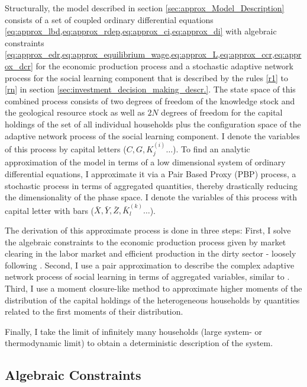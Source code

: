 Structurally, the model described in section \ref{sec:approx_Model_Description} consists of a set of coupled ordinary differential equations \cref{eq:approx_lbd,eq:approx_rdep,eq:approx_ci,eq:approx_di} with algebraic constraints \cref{eq:approx_edr,eq:approx_equilibrium_wage,eq:approx_L,eq:approx_ccr,eq:approx_dcr} for the economic production process and a stochastic adaptive network process for the social learning component that is described by the rules \ref{r1} to \ref{rn} in section \ref{sec:investment_decision_making_descr.}. The state space of this combined process consists of two degrees of freedom of the knowledge stock and the geological resource stock as well as $2N$ degrees of freedom for the capital holdings of the set of all individual households plus the configuration space of the adaptive network process of the social learning component. I denote the variables of this process by capital letters ($C, G, K_j^{(i)}\dots$).
To find an analytic approximation of the model in terms of a low dimensional system of ordinary differential equations, I approximate it via a Pair Based Proxy (PBP) process, a stochastic process in terms of aggregated quantities, thereby drastically reducing the dimensionality of the phase space. I denote the variables of this process with capital letter with bars ($\bar{X}, \bar{Y}, \bar{Z}, \bar{K}_l^{(k)}\dots$).

The derivation of this approximate process is done in three steps: First, I solve the algebraic constraints to the economic production process given by market clearing in the labor market and efficient production in the dirty sector - loosely following \cite{Nitzbon2017}. Second, I use a pair approximation to describe the complex adaptive network process of social learning in terms of aggregated variables, similar to \cite{Rogers2012}. Third, I use a moment closure-like method to approximate higher moments of the distribution of the capital holdings of the heterogeneous households by quantities related to the first moments of their distribution.

Finally, I take the limit of infinitely many households (large system- or thermodynamic limit) to obtain a deterministic description of the system.

\subsection{Algebraic Constraints}

